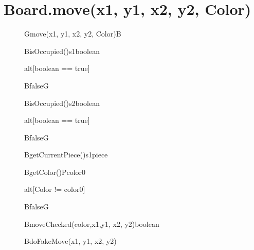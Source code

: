\documentclass[8pt]{article}
\begin{document}
\section{Board.move(x1, y1, x2, y2, Color)}
\begin{figure}[H]
	\centering
  	\begin{adjustbox}{width=\textwidth, height=\textheight}
		\begin{sequencediagram}
			
			\begin{messcall}{G}{move(x1, y1, x2, y2, Color)}{B}{}	
				\begin{call}{B}{isOccupied()}{s1}{boolean}
				\end{call}
				\begin{sdblock}{alt}{[boolean == true]}
					\begin{messcall}{B}{false}{G}
					\end{messcall} 					  		
				\end{sdblock}
				
				\begin{call}{B}{isOccupied()}{s2}{boolean}
				\end{call}
				\begin{sdblock}{alt}{[boolean == true]}
					\begin{messcall}{B}{false}{G}
					\end{messcall} 					  		
				\end{sdblock}
				
				\begin{call}{B}{getCurrentPiece()}{s1}{piece}
				\end{call}
				
				\begin{call}{B}{getColor()}{P}{color0}
				\end{call}
					
					
				\begin{sdblock}{alt}{[Color != color0]}
					\begin{messcall}{B}{false}{G}
					\end{messcall} 					  		
				\end{sdblock}
				
				\begin{callself}{B}{moveChecked(color,x1,y1, x2, y2)}{boolean}
					\begin{callself}{B}{doFakeMove(x1, y1, x2, y2)}{}
					\end{callself}
					

\end{callself}
\end{messcall}
\end{sequencediagram}
\end{adjustbox}
\end{figure}
\end{document}
